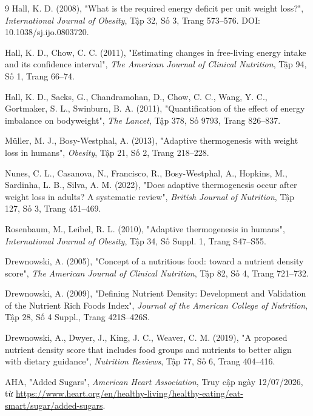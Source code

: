 \documentclass[12pt, a4paper]{report}
\begin{document}
\begin{thebibliography}{9}
Hall, K. D. (2008),
"What is the required energy deficit per unit weight loss?",
\textit{International Journal of Obesity}, Tập 32, Số 3, Trang 573--576. DOI: 10.1038/sj.ijo.0803720.

Hall, K. D., Chow, C. C. (2011),
"Estimating changes in free-living energy intake and its confidence interval",
\textit{The American Journal of Clinical Nutrition}, Tập 94, Số 1, Trang 66--74.

Hall, K. D., Sacks, G., Chandramohan, D., Chow, C. C., Wang, Y. C., Gortmaker, S. L., Swinburn, B. A. (2011),
"Quantification of the effect of energy imbalance on bodyweight",
\textit{The Lancet}, Tập 378, Số 9793, Trang 826--837.

Müller, M. J., Bosy-Westphal, A. (2013),
"Adaptive thermogenesis with weight loss in humans",
\textit{Obesity}, Tập 21, Số 2, Trang 218--228.

Nunes, C. L., Casanova, N., Francisco, R., Bosy-Westphal, A., Hopkins, M., Sardinha, L. B., Silva, A. M. (2022),
"Does adaptive thermogenesis occur after weight loss in adults? A systematic review",
\textit{British Journal of Nutrition}, Tập 127, Số 3, Trang 451--469.

Rosenbaum, M., Leibel, R. L. (2010),
"Adaptive thermogenesis in humans",
\textit{International Journal of Obesity}, Tập 34, Số Suppl. 1, Trang S47--S55.

Drewnowski, A. (2005),
"Concept of a nutritious food: toward a nutrient density score",
\textit{The American Journal of Clinical Nutrition}, Tập 82, Số 4, Trang 721--732.

Drewnowski, A. (2009),
"Defining Nutrient Density: Development and Validation of the Nutrient Rich Foods Index",
\textit{Journal of the American College of Nutrition}, Tập 28, Số 4 Suppl., Trang 421S--426S.

Drewnowski, A., Dwyer, J., King, J. C., Weaver, C. M. (2019),
"A proposed nutrient density score that includes food groups and nutrients to better align with dietary guidance",
\textit{Nutrition Reviews}, Tập 77, Số 6, Trang 404--416.

AHA,
"Added Sugars",
\textit{American Heart Association}, Truy cập ngày 12/07/2026, từ \url{https://www.heart.org/en/healthy-living/healthy-eating/eat-smart/sugar/added-sugars}.


\end{thebibliography}
\end{document}
